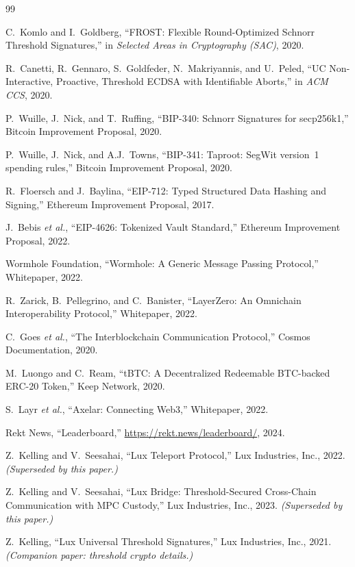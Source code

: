 \begin{thebibliography}{99}

 C.~Komlo and I.~Goldberg, ``FROST: Flexible Round-Optimized Schnorr Threshold Signatures,'' in \emph{Selected Areas in Cryptography (SAC)}, 2020.

 R.~Canetti, R.~Gennaro, S.~Goldfeder, N.~Makriyannis, and U.~Peled, ``UC Non-Interactive, Proactive, Threshold ECDSA with Identifiable Aborts,'' in \emph{ACM CCS}, 2020.

 P.~Wuille, J.~Nick, and T.~Ruffing, ``BIP-340: Schnorr Signatures for secp256k1,'' Bitcoin Improvement Proposal, 2020.

 P.~Wuille, J.~Nick, and A.J.~Towns, ``BIP-341: Taproot: SegWit version~1 spending rules,'' Bitcoin Improvement Proposal, 2020.

 R.~Floersch and J.~Baylina, ``EIP-712: Typed Structured Data Hashing and Signing,'' Ethereum Improvement Proposal, 2017.

 J.~Bebis \emph{et al.}, ``EIP-4626: Tokenized Vault Standard,'' Ethereum Improvement Proposal, 2022.

 Wormhole Foundation, ``Wormhole: A Generic Message Passing Protocol,'' Whitepaper, 2022.

 R.~Zarick, B.~Pellegrino, and C.~Banister, ``LayerZero: An Omnichain Interoperability Protocol,'' Whitepaper, 2022.

 C.~Goes \emph{et al.}, ``The Interblockchain Communication Protocol,'' Cosmos Documentation, 2020.

 M.~Luongo and C.~Ream, ``tBTC: A Decentralized Redeemable BTC-backed ERC-20 Token,'' Keep Network, 2020.

 S.~Layr \emph{et al.}, ``Axelar: Connecting Web3,'' Whitepaper, 2022.

 Rekt News, ``Leaderboard,'' \url{https://rekt.news/leaderboard/}, 2024.

 Z.~Kelling and V.~Seesahai, ``Lux Teleport Protocol,'' Lux Industries, Inc., 2022. \emph{(Superseded by this paper.)}

 Z.~Kelling and V.~Seesahai, ``Lux Bridge: Threshold-Secured Cross-Chain Communication with MPC Custody,'' Lux Industries, Inc., 2023. \emph{(Superseded by this paper.)}

 Z.~Kelling, ``Lux Universal Threshold Signatures,'' Lux Industries, Inc., 2021. \emph{(Companion paper: threshold crypto details.)}

\end{thebibliography}

